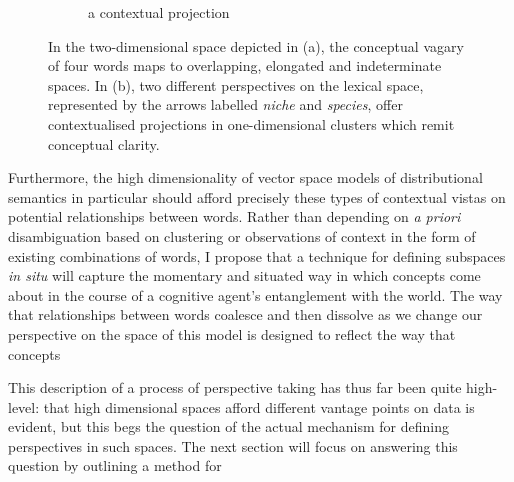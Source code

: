 \begin{figure}[t]
\begin{subfigure}[t]{0.5\textwidth}
    \caption{a contextual projection}
    \label{fig:perspective}
    \end{subfigure}
  \caption{In the two-dimensional space depicted in (a), the conceptual vagary of four words maps to overlapping, elongated and indeterminate spaces.  In (b), two different perspectives on the lexical space, represented by the arrows labelled \emph{niche} and \emph{species}, offer contextualised projections in one-dimensional clusters which remit conceptual clarity.}
\end{figure}

Furthermore, the high dimensionality of vector space models of distributional semantics in particular should afford precisely these types of contextual vistas on potential relationships between words.  Rather than depending on \emph{a priori} disambiguation based on clustering or observations of context in the form of existing combinations of words, I propose that a technique for defining subspaces \emph{in situ} will capture the momentary and situated way in which concepts come about in the course of a cognitive agent's entanglement with the world.  The way that relationships between words coalesce and then dissolve as we change our perspective on the space of this model is designed to reflect the way that concepts 

This description of a process of perspective taking has thus far been quite high-level: that high dimensional spaces afford different vantage points on data is evident, but this begs the question of the actual mechanism for defining perspectives in such spaces.  The next section will focus on answering this question by outlining a method for 

